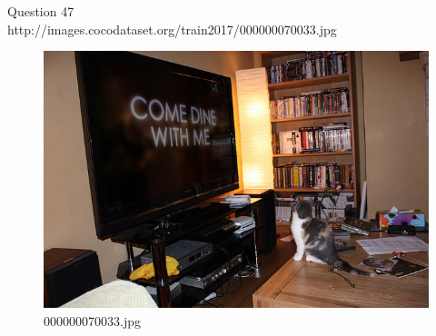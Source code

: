 Question 47\\
http://images.cocodataset.org/train2017/000000070033.jpg
\begin{figure}[h]
    \centering
    \includegraphics[width=0.8\linewidth]{../image set/hard/000000070033.jpg}
    \caption{000000070033.jpg}
\end{figure}
